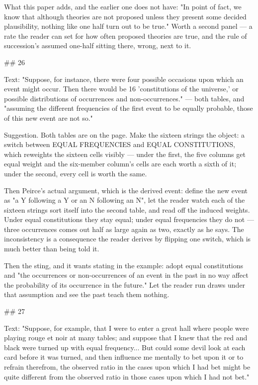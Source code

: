 What this paper adds, and the earlier one does not have: "In point of fact, we
know that although theories are not proposed unless they present some decided
plausibility, nothing like one half turn out to be true." Worth a second panel —
a rate the reader can set for how often proposed theories are true, and the
rule of succession's assumed one-half sitting there, wrong, next to it.


## 26

Text: "Suppose, for instance, there were four possible occasions upon which an
event might occur. Then there would be 16 'constitutions of the universe,' or
possible distributions of occurrences and non-occurrences." — both tables, and
"assuming the different frequencies of the first event to be equally probable,
those of this new event are not so."

Suggestion. Both tables are on the page. Make the sixteen strings the object:
a switch between EQUAL FREQUENCIES and EQUAL CONSTITUTIONS, which reweights the
sixteen cells visibly — under the first, the five columns get equal weight and
the six-member column's cells are each worth a sixth of it; under the second,
every cell is worth the same.

Then Peirce's actual argument, which is the derived event: define the new event
as "a Y following a Y or an N following an N", let the reader watch each of the
sixteen strings sort itself into the second table, and read off the induced
weights. Under equal constitutions they stay equal; under equal frequencies they
do not — three occurrences comes out half as large again as two, exactly as he
says. The inconsistency is a consequence the reader derives by flipping one
switch, which is much better than being told it.

Then the sting, and it wants stating in the example: adopt equal constitutions
and "the occurrences or non-occurrences of an event in the past in no way affect
the probability of its occurrence in the future." Let the reader run draws under
that assumption and see the past teach them nothing.


## 27

Text: "Suppose, for example, that I were to enter a great hall where people were
playing rouge et noir at many tables; and suppose that I knew that the red and
black were turned up with equal frequency... But could some devil look at each
card before it was turned, and then influence me mentally to bet upon it or to
refrain therefrom, the observed ratio in the cases upon which I had bet might be
quite different from the observed ratio in those cases upon which I had not
bet."

